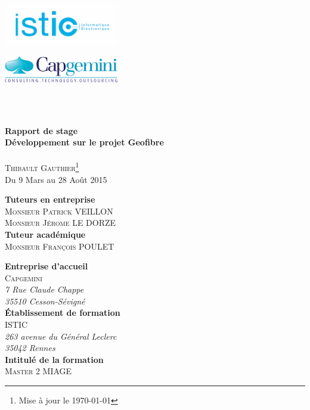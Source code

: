 \begin{titlepage}
  \begin{minipage}[t]{7cm} %
    \flushleft \includegraphics[width = 5cm]{images/logo_istic.png}
  \end{minipage}
  \hfill
  \begin{minipage}[t]{7cm}
    \flushright \includegraphics[width = 5cm]{images/logo_capgemini.png}
  \end{minipage}
  \\[2cm]
  \begin{center}
    \hr\\[0.5cm]
    {\huge\textbf{Rapport de stage }}\\[0.4cm]
    {\large\textbf{Développement sur le projet Geofibre}}\\[0.4cm]
    \hr\\[0.5cm]
    \textsc{Thibault Gauthier\footnote{Mise à jour le \today}}\\[0.4cm]
    Du 9 Mars au 28 Août 2015\\[2.5cm]
  \end{center}
  \begin{minipage}[t]{8cm} %
    \textbf{Tuteurs en entreprise}\\
    \textsc{Monsieur Patrick VEILLON\\Monsieur Jérome LE DORZE}\\[0.5cm]
    \textbf{Tuteur académique}\\
    \textsc{Monsieur François POULET}
  \end{minipage}
  \hfill
  \begin{minipage}[t]{8cm}
    \textbf{Entreprise d'accueil} \\
    \textsc{Capgemini}\\
    \textit{7 Rue Claude Chappe\\
    35510 Cesson-Sévigné}\\[0.5cm]
    \textbf{\'Etablissement de formation}\\
    \textsc{ISTIC\footnotemark}\\
    \textit{263 avenue du Général Leclerc\\
    35042 Rennes}\\[0.5cm]
    \textbf{Intitulé de la formation}\\
    \textsc{Master 2 MIAGE\footnotemark}

  \end{minipage}
  \addtocounter{footnote}{-2} %

\end{titlepage}
